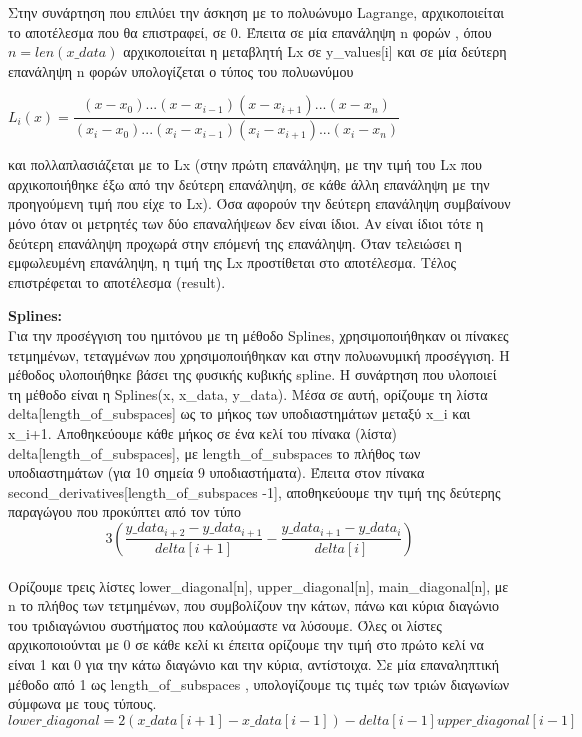 \documentclass{article}
\begin{document}
\par
Στην συνάρτηση που επιλύει την άσκηση με το πολυώνυμο Lagrange, αρχικοποιείται το αποτέλεσμα που θα επιστραφεί, σε 0. Έπειτα σε μία επανάληψη n φορών , όπου $n = len(x\_data)$ αρχικοποιείται η μεταβλητή Lx σε y\_values[i] και σε μία δεύτερη επανάληψη n φορών υπολογίζεται ο τύπος του πολυωνύμου
\begin{center}
$L_i(x) = \dfrac{(x-x_0)...(x - x_{i-1})(x-x_{i+1})...(x-x_n)} {(x_i - x_0)...(x_i - x_{i-1})(x_i - x_{i+1})...(x_i - x_n)}$
\end{center}και πολλαπλασιάζεται με το Lx (στην πρώτη επανάληψη, με την τιμή του Lx που αρχικοποιήθηκε έξω από την δεύτερη επανάληψη, σε κάθε άλλη επανάληψη με την προηγούμενη τιμή που είχε το Lx). Όσα αφορούν την δεύτερη επανάληψη συμβαίνουν μόνο όταν οι μετρητές των δύο επαναλήψεων δεν είναι ίδιοι. Αν είναι ίδιοι τότε η δεύτερη επανάληψη προχωρά στην επόμενή της επανάληψη. Όταν τελειώσει η εμφωλευμένη επανάληψη, η τιμή της Lx προστίθεται στο αποτέλεσμα. Τέλος επιστρέφεται το αποτέλεσμα (result).
\par\textbf{Splines:}\\
Για την προσέγγιση του ημιτόνου με τη μέθοδο Splines, χρησιμοποιήθηκαν οι πίνακες τετμημένων, τεταγμένων που χρησιμοποιήθηκαν και στην πολυωνυμική προσέγγιση. Η μέθοδος υλοποιήθηκε βάσει της φυσικής κυβικής spline. Η συνάρτηση που υλοποιεί τη μέθοδο είναι η Splines(x, x\_data, y\_data). Μέσα σε αυτή, ορίζουμε τη λίστα delta[length\_of\_subspaces] ως το μήκος των υποδιαστημάτων μεταξύ x\_i και x\_{i+1}. Αποθηκεύουμε κάθε μήκος σε ένα κελί του πίνακα (λίστα) delta[length\_of\_subspaces], με length\_of\_subspaces το πλήθος των υποδιαστημάτων (για 10 σημεία 9 υποδιαστήματα). Έπειτα στον πίνακα second\_derivatives[length\_of\_subspaces -1], αποθηκεύουμε την τιμή της δεύτερης παραγώγου που προκύπτει από τον τύπο 
\begin{equation}
    3\left(\dfrac{ y\_data_{i+2} - y\_data_{i+1}}{delta[i+1]} -  \dfrac{ y\_data_{i+1} - y\_data_i}{delta[i]}\right)
\end{equation} \\
Ορίζουμε τρεις λίστες lower\_diagonal[n], upper\_diagonal[n], main\_diagonal[n], με n το πλήθος των τετμημένων, που συμβολίζουν την κάτων, πάνω και κύρια διαγώνιο του τριδιαγώνιου συστήματος που καλούμαστε να λύσουμε. Όλες οι λίστες αρχικοποιούνται με 0 σε κάθε κελί κι έπειτα ορίζουμε την τιμή στο πρώτο κελί να είναι 1 και 0 για την κάτω διαγώνιο και την κύρια, αντίστοιχα. Σε μία επαναληπτική μέθοδο από 1 ως
length\_of\_subspaces , υπολογίζουμε τις τιμές των τριών διαγωνίων σύμφωνα με τους τύπους.
\begin{equation*}
    lower\_diagonal = 2(x\_data[i+1] - x\_data[i -1]) - delta[i-1]upper\_diagonal[i-1]
\end{equation*}
\end{document}
